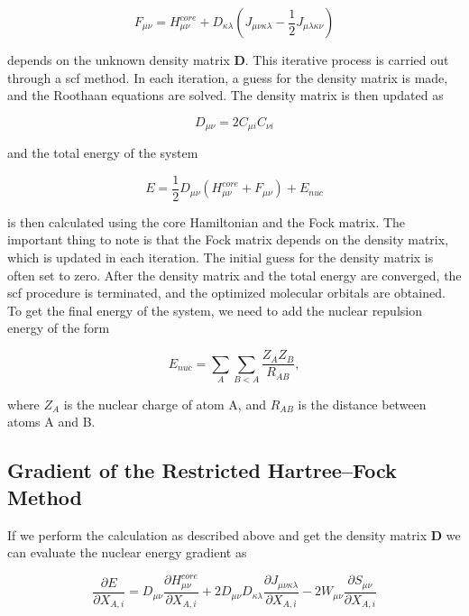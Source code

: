 \begin{equation}\label{eq:fock}
F_{\mu\nu}=H_{\mu\nu}^{core}+D_{\kappa\lambda}(J_{\mu\nu\kappa\lambda}-\frac{1}{2}J_{\mu\lambda\kappa\nu})
\end{equation}

depends on the unknown density matrix \(\mathbf{D}\). This iterative process is carried out through a \acrfull{scf} method. In each iteration, a guess for the density matrix is made, and the Roothaan equations are solved. The density matrix is then updated as

\begin{equation}
D_{\mu\nu}=2C_{\mu i}C_{\nu i}
\end{equation}

and the total energy of the system

\begin{equation}
E=\frac{1}{2}D_{\mu\nu}(H_{\mu\nu}^{core}+F_{\mu\nu})+E_{nuc}
\end{equation}

is then calculated using the core Hamiltonian and the Fock matrix. The important thing to note is that the Fock matrix depends on the density matrix, which is updated in each iteration. The initial guess for the density matrix is often set to zero. After the density matrix and the total energy are converged, the \acrshort{scf} procedure is terminated, and the optimized molecular orbitals are obtained. To get the final energy of the system, we need to add the nuclear repulsion energy of the form

\begin{equation}
E_{nuc}=\sum_{A}\sum_{B<A}\frac{Z_{A}Z_{B}}{R_{AB}},
\end{equation}

where \(Z_A\) is the nuclear charge of atom A, and \(R_{AB}\) is the distance between atoms A and B.

\subsection{Gradient of the Restricted Hartree--Fock Method}

If we perform the calculation as described above and get the density matrix \(\mathbf{D}\) we can evaluate the nuclear energy gradient as

\begin{equation}
\frac{\partial E}{\partial X_{A,i}}=D_{\mu\nu}\frac{\partial H_{\mu\nu}^{core}}{\partial X_{A,i}}+2D_{\mu\nu}D_{\kappa\lambda}\frac{\partial J_{\mu\nu\kappa\lambda}}{\partial X_{A,i}}-2W_{\mu\nu}\frac{\partial S_{\mu\nu}}{\partial X_{A,i}}
\end{equation}

